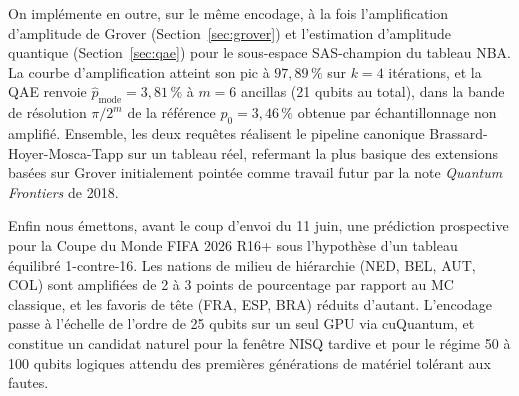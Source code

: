 \documentclass[11pt]{article}
\begin{document}
On implémente en outre, sur le même encodage, à la fois
l'amplification d'amplitude de Grover (Section~\ref{sec:grover}) et
l'estimation d'amplitude quantique (Section~\ref{sec:qae}) pour le
sous-espace SAS-champion du tableau NBA. La courbe d'amplification
atteint son pic à $97{,}89\,\%$ sur $k = 4$ itérations, et la QAE
renvoie $\hat p_{\text{mode}} = 3{,}81\,\%$ à $m = 6$ ancillas
(21 qubits au total), dans la bande de résolution $\pi/2^m$ de la
référence $p_0 = 3{,}46\,\%$ obtenue par échantillonnage non
amplifié. Ensemble, les deux requêtes réalisent le pipeline canonique
Brassard-Hoyer-Mosca-Tapp sur un tableau réel, refermant la plus
basique des extensions basées sur Grover initialement pointée comme
travail futur par la note \emph{Quantum Frontiers} de 2018.

Enfin nous émettons, avant le coup d'envoi du 11 juin, une prédiction
prospective pour la Coupe du Monde FIFA 2026 R16+ sous l'hypothèse
d'un tableau équilibré 1-contre-16. Les nations de milieu de
hiérarchie (NED, BEL, AUT, COL) sont amplifiées de 2 à 3 points de
pourcentage par rapport au MC classique, et les favoris de tête
(FRA, ESP, BRA) réduits d'autant. L'encodage passe à l'échelle de
l'ordre de 25 qubits sur un seul GPU via cuQuantum, et constitue un
candidat naturel pour la fenêtre NISQ tardive et pour le régime 50 à
100 qubits logiques attendu des premières générations de matériel
tolérant aux fautes.



\end{document}
